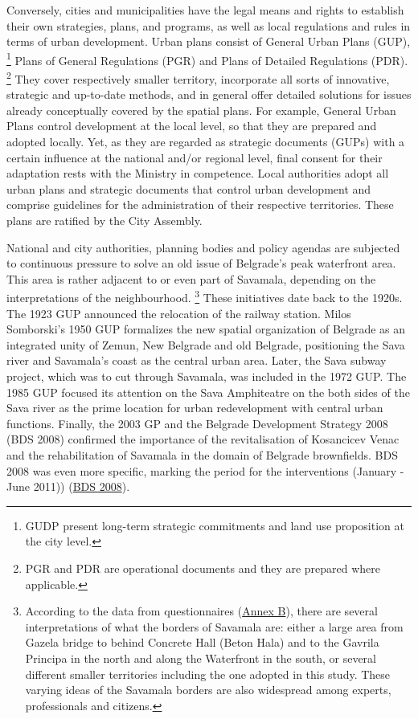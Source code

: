 \documentclass[11pt]{report}
\begin{document}
{{{{\begin{itemize}
Conversely, cities and municipalities have the legal means and rights to establish their own strategies, plans, and programs, as well as local regulations and rules in terms of urban development. Urban plans consist of General Urban Plans (GUP),
\footnote{GUDP present long-term strategic commitments and land use proposition at the city level.} Plans of General Regulations (PGR) and Plans of Detailed Regulations (PDR).
\footnote{PGR and PDR are operational documents and they are prepared where applicable.}
They cover respectively smaller territory, incorporate all sorts of innovative, strategic and up-to-date methods, and in general offer detailed solutions for issues already conceptually covered by the spatial plans. For example, General Urban Plans control development at the local level, so that they are prepared and adopted locally. Yet, as they are regarded as strategic documents (GUPs) with a certain influence at the national and/or regional level, final consent for their adaptation rests with the Ministry in competence. Local authorities adopt all urban plans and strategic documents that control urban development and comprise guidelines for the administration of their respective territories. These plans are ratified by the City Assembly.

National and city authorities, planning bodies and policy agendas are subjected to continuous pressure to solve an old issue of Belgrade’s peak waterfront area. This area is rather adjacent to or even part of Savamala, depending on the interpretations of the neighbourhood.
\footnote{According to the data from questionnaires (\href{ref}{Annex B}), there are several interpretations of what the borders of Savamala are: either a large area from Gazela bridge to behind Concrete Hall (Beton Hala) and to the Gavrila Principa in the north and along the Waterfront in the south, or several different smaller territories including the one adopted in this study. These varying ideas of the Savamala borders are also widespread among experts, professionals and citizens.}
These initiatives date back to the 1920s. The 1923 GUP announced the relocation of the railway station. Milos Somborski’s 1950 GUP formalizes the new spatial organization of Belgrade as an integrated unity of Zemun, New Belgrade and old Belgrade, positioning the Sava river and Savamala’s coast as the central urban area. Later, the Sava subway project, which was to cut through Savamala, was included in the 1972 GUP. The 1985 GUP focused its attention on the Sava Amphiteatre on the both sides of the Sava river as the prime location for urban redevelopment with central urban functions. Finally, the 2003 GP and the Belgrade Development Strategy 2008 (BDS 2008) confirmed the importance of the revitalisation of Kosancicev Venac and the rehabilitation of Savamala in the domain of Belgrade brownfields. BDS 2008 was even more specific, marking the period for the interventions (January - June 2011)) (\href{ref}{BDS 2008}).
\\


\end{itemize}}}}}
\end{document}
